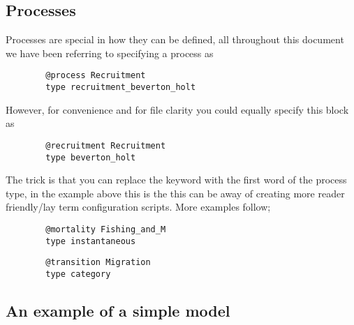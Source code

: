 \subsection{Processes}

Processes are special in how they can be defined, all throughout this document we have been referring to specifying a process as

{\small{\begin{verbatim}
		@process Recruitment
		type recruitment_beverton_holt
		\end{verbatim}}}
	
However, for convenience and for file clarity you could equally specify this block as

{\small{\begin{verbatim}
		@recruitment Recruitment
		type beverton_holt
		\end{verbatim}}}

The trick is that you can replace the keyword  with the first word of the process type, in the example above this is the  this can be away of creating more reader friendly/lay term configuration scripts. More examples follow;

{\small{\begin{verbatim}
		@mortality Fishing_and_M
		type instantaneous
		\end{verbatim}}}

{\small{\begin{verbatim}
		@transition Migration
		type category
		\end{verbatim}}}

\subsection{An example of a simple model\label{example1}}




%

